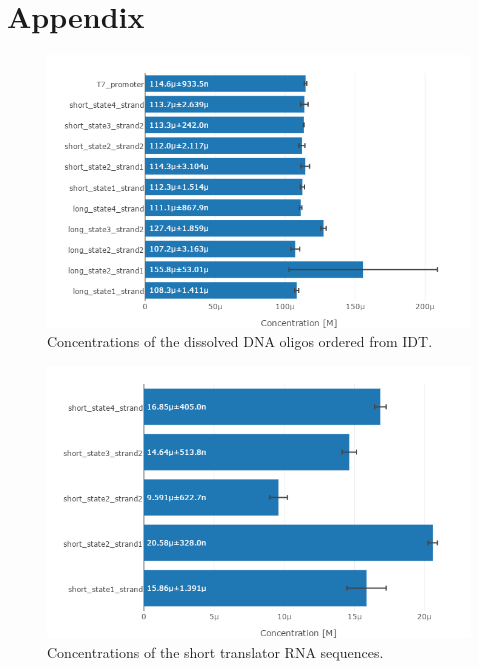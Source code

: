 \section{Appendix}

\begin{figure}[H]
\centering
\includegraphics[width=\columnwidth]{images/oligo_concentrations.png}
\caption{Concentrations of the dissolved DNA oligos ordered from IDT.}
\label{oligo_concentrations}
\end{figure}

\begin{figure}[H]
\centering
\includegraphics[width=\columnwidth]{images/translator_transcription_concentration.png}
\caption{Concentrations of the short translator RNA sequences.}
\label{translator_transcription_concentration}
\end{figure}


